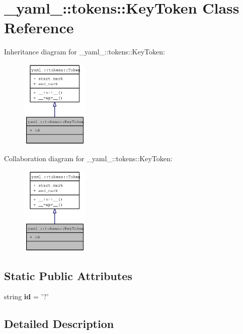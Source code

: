 \section{\_\-yaml\_\-::tokens::KeyToken Class Reference}
\label{class__yaml___1_1tokens_1_1KeyToken}
Inheritance diagram for \_\-yaml\_\-::tokens::KeyToken:\nopagebreak
\begin{figure}[H]
\begin{center}
\leavevmode
\includegraphics[width=91pt]{class__yaml___1_1tokens_1_1KeyToken__inherit__graph}
\end{center}
\end{figure}
Collaboration diagram for \_\-yaml\_\-::tokens::KeyToken:\nopagebreak
\begin{figure}[H]
\begin{center}
\leavevmode
\includegraphics[width=91pt]{class__yaml___1_1tokens_1_1KeyToken__coll__graph}
\end{center}
\end{figure}
\subsection*{Static Public Attributes}
\begin{CompactItemize}
\item 
string {\bf id} = '?'
\end{CompactItemize}


\subsection{Detailed Description}


